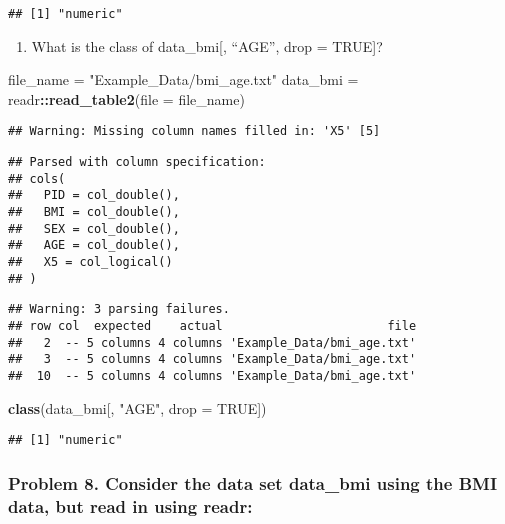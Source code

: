 \documentclass[]{article}
\newenvironment{Shaded}{\begin{snugshade}}{\end{snugshade}}
\newcommand{\DataTypeTok}[1]{\textcolor[rgb]{0.13,0.29,0.53}{#1}}
\newcommand{\KeywordTok}[1]{\textcolor[rgb]{0.13,0.29,0.53}{\textbf{#1}}}
\newcommand{\NormalTok}[1]{#1}
\newcommand{\OperatorTok}[1]{\textcolor[rgb]{0.81,0.36,0.00}{\textbf{#1}}}
\newcommand{\OtherTok}[1]{\textcolor[rgb]{0.56,0.35,0.01}{#1}}
\newcommand{\StringTok}[1]{\textcolor[rgb]{0.31,0.60,0.02}{#1}}
\providecommand{\tightlist}{%
  \setlength{\itemsep}{0pt}\setlength{\parskip}{0pt}}
\begin{document}
\begin{verbatim}
## [1] "numeric"
\end{verbatim}

\begin{enumerate}
\def\labelenumi{\alph{enumi}.}
\setcounter{enumi}{3}
\tightlist
\item
  What is the class of data\_bmi{[}, ``AGE'', drop = TRUE{]}?
\end{enumerate}

\begin{Shaded}
\begin{Highlighting}[]
\NormalTok{file_name =}\StringTok{ "Example_Data/bmi_age.txt"}
\NormalTok{data_bmi =}\StringTok{ }\NormalTok{readr}\OperatorTok{::}\KeywordTok{read_table2}\NormalTok{(}\DataTypeTok{file =}\NormalTok{ file_name)}
\end{Highlighting}
\end{Shaded}

\begin{verbatim}
## Warning: Missing column names filled in: 'X5' [5]
\end{verbatim}

\begin{verbatim}
## Parsed with column specification:
## cols(
##   PID = col_double(),
##   BMI = col_double(),
##   SEX = col_double(),
##   AGE = col_double(),
##   X5 = col_logical()
## )
\end{verbatim}

\begin{verbatim}
## Warning: 3 parsing failures.
## row col  expected    actual                       file
##   2  -- 5 columns 4 columns 'Example_Data/bmi_age.txt'
##   3  -- 5 columns 4 columns 'Example_Data/bmi_age.txt'
##  10  -- 5 columns 4 columns 'Example_Data/bmi_age.txt'
\end{verbatim}

\begin{Shaded}
\begin{Highlighting}[]
\KeywordTok{class}\NormalTok{(data_bmi[, }\StringTok{"AGE"}\NormalTok{, }\DataTypeTok{drop =} \OtherTok{TRUE}\NormalTok{])}
\end{Highlighting}
\end{Shaded}

\begin{verbatim}
## [1] "numeric"
\end{verbatim}

\hypertarget{problem-8.-consider-the-data-set-data_bmi-using-the-bmi-data-but-read-in-using-readr}{%
\subsubsection{Problem 8. Consider the data set data\_bmi using the BMI
data, but read in using
readr:}\label{problem-8.-consider-the-data-set-data_bmi-using-the-bmi-data-but-read-in-using-readr}}
\end{document}
